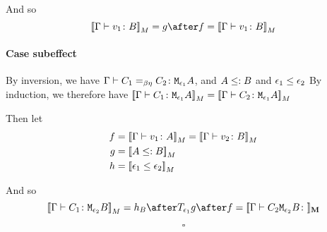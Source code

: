 {    And so
    \begin{equation}
            \deno{\gtyperelation{v_1}{B}} = g \after f = \deno{\gtyperelation{v_1}{B}}
    \end{equation}
    \paragraph{Case subeffect}
    By inversion, we have $\Gamma \vdash C_1 =_{\beta\eta} C_2 \colon \texttt{M}_{\epsilon_1}{A}$, and $A \leq: B$ and $\epsilon_1 \leq \epsilon_2$
    By induction, we therefore have ${\bf [\![}\Gamma \vdash C_1 \colon \texttt{M}_{\epsilon_1}{A}{\bf ]\!]}_M = {\bf [\![}\Gamma \vdash C_2 \colon \texttt{M}_{\epsilon_1}{A}{\bf ]\!]}_M$

    Then let
    \begin{align}
        f &{}=\deno{\gtyperelation{v_1}{A}} = \deno{\gtyperelation{v_2}{B}}\\
        g &{}=\deno{A \subtype B}\\
        h &{}=\deno{\e_1\subeffect\e_2}
    \end{align}

    And so
    \begin{equation}
            \deno{\gtyperelation{C_1}{\M{\e_2}{B}}} = h_B \after \T{\e_1}{g} \after f = \deno{\gtyperelation{C_2{\M{\e_2}{B}}}}
    \end{equation}

    $$\square$$
}

\ifdefined\NoDocument
\else
\documentclass{report}





   \BetaEtaEquivalence

\fi